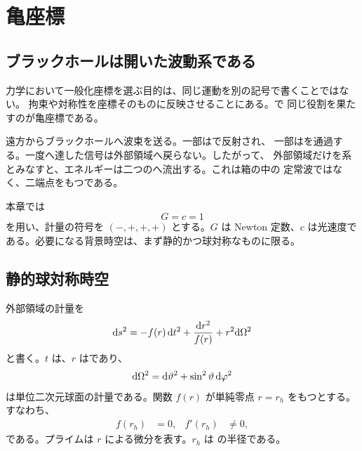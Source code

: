 \chapter{亀座標}
\label{chap:tortoise}

\section{ブラックホールは開いた波動系である}

力学において一般化座標を選ぶ目的は、同じ運動を別の記号で書くことではない。
拘束や対称性を座標そのものに反映させることにある。で
同じ役割を果たすのが亀座標である。

遠方からブラックホールへ波束を送る。一部はで反射され、
一部はを通過する。一度へ達した信号は外部領域へ戻らない。したがって、
外部領域だけを系とみなすと、エネルギーは二つのへ流出する。これは箱の中の
定常波ではなく、二端点をもつである。

本章では
\begin{equation}
G=c=1
\label{eq:geometrized_units}
\end{equation}
を用い、計量の符号を $(-,+,+,+)$ とする。$G$ は Newton 定数、$c$ は光速度で
ある。必要になる背景時空は、まず静的かつ球対称なものに限る。

\section{静的球対称時空}

外部領域の計量を
\begin{equation}
\mathrm{d} s^2
=
-f(r)\,\mathrm{d} t^2
+\frac{\mathrm{d} r^2}{f(r)}
+r^2\mathrm{d}\Omega^2
\label{eq:sss_metric}
\end{equation}
と書く。$t$ は、$r$ はであり、
\begin{equation}
\mathrm{d}\Omega^2
=
\mathrm{d}\vartheta^2
+\sin^2\vartheta\,\mathrm{d}\varphi^2
\end{equation}
は単位二次元球面の計量である。関数 $f(r)$ が単純零点 $r=r_h$ をもつとする。
すなわち、
\begin{align}
f(r_h)&=0,
&
f'(r_h)&\ne 0,
\label{eq:simple_horizon}
\end{align}
である。プライムは $r$ による微分を表す。$r_h$ は の半径である。

